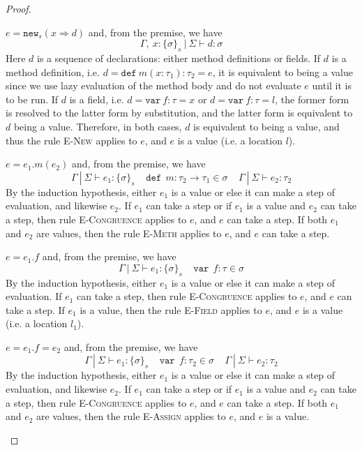 \documentclass{llncs}
\newcommand{\keywadj}[1]{\mathtt{#1}}
\newcommand{\keyw}[1]{\keywadj{#1}~}
\newcommand{\pcase}[1][]{
  \if\relax\detokenize{#1}\relax
    \def\thiscase{}
  \else
    \def\thiscase{~#1}
  \fi
  \item
}
\begin{document}
\begin{proof}
\begin{pcases}
\pcase[\textsc{T-New}]
$e = \keywadj{new}_{s}(x \Rightarrow d)$ and, from the premise, we have
\[
\Gamma,~x : \{ \sigma \}_{s}~|~\Sigma \vdash d : \sigma
\]
Here $d$ is a sequence of declarations: either method definitions or fields. If $d$ is a method definition, i.e. $d = \keyw{def} m(x : \tau_1) : \tau_2 = e$, it is equivalent to being a value since we use lazy evaluation of the method body and do not evaluate $e$ until it is to be run. If $d$ is a field, i.e. $d = \keyw{var} f : \tau = x$ or $d = \keyw{var} f : \tau = l$, the former form is resolved to the latter form by substitution, and the latter form is equivalent to $d$ being a value. Therefore, in both cases, $d$ is equivalent to being a value, and thus the rule \textsc{E-New} applies to $e$, and $e$ is a value (i.e. a location $l$).
\\
\pcase[\textsc{T-Meth}]
$e = e_1.m(e_2)$ and, from the premise, we have
\[
\Gamma~|~\Sigma \vdash e_1 : \{\sigma\}_s~~~~~\keyw{def}~ m : \tau_2 \rightarrow \tau_1 \in \sigma~~~~~\Gamma~|~\Sigma \vdash e_2 : \tau_2
\]
By the induction hypothesis, either $e_1$ is a value or else it can make a step of evaluation, and likewise $e_2$. If $e_1$ can take a step or if $e_1$ is a value and $e_2$ can take a step, then rule \textsc{E-Congruence} applies to $e$, and $e$ can take a step. If both $e_1$ and $e_2$ are values, then the rule \textsc{E-Meth} applies to $e$, and $e$ can take a step.
\\
\pcase[\textsc{T-Field}]
$e = e_1.f$ and, from the premise, we have
\[
\Gamma~|~\Sigma \vdash e_1 : \{\sigma\}_s~~~~~\keyw{var}~ f : \tau \in \sigma
\]
By the induction hypothesis, either $e_1$ is a value or else it can make a step of evaluation. If $e_1$ can take a step, then rule \textsc{E-Congruence} applies to $e$, and $e$ can take a step. If $e_1$ is a value, then the rule \textsc{E-Field} applies to $e$, and $e$ is a value (i.e. a location $l_1$).
\\
\pcase[\textsc{T-Assign}]
$e = e_1.f=e_2$ and, from the premise, we have
\[
\Gamma~|~\Sigma \vdash e_1 : \{\sigma\}_s~~~~~\keyw{var}~ f:\tau_2 \in \sigma~~~~~\Gamma~|~\Sigma \vdash e_2 : \tau_2
\]
By the induction hypothesis, either $e_1$ is a value or else it can make a step of evaluation, and likewise $e_2$. If $e_1$ can take a step or if $e_1$ is a value and $e_2$ can take a step, then rule \textsc{E-Congruence} applies to $e$, and $e$ can take a step. If both $e_1$ and $e_2$ are values, then the rule \textsc{E-Assign} applies to $e$, and $e$ is a value.
\\

\end{pcases}
\end{proof}
\end{document}
